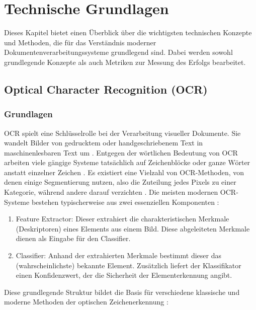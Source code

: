 \chapter{Technische Grundlagen}
\label{cha:technische-grundlagen}

Dieses Kapitel bietet einen Überblick über die wichtigsten technischen Konzepte und Methoden, die für das Verständnis moderner Dokumentenverarbeitungssysteme grundlegend sind. Dabei werden sowohl grundlegende Konzepte als auch Metriken zur Messung des Erfolgs bearbeitet. 

\section{Optical Character Recognition (OCR)}
\label{sec:optical-character-recognition-ocr}

\subsection{Grundlagen}
\label{subsec:grundlagen-ocr}

\gls{OCR} spielt eine Schlüsselrolle bei der Verarbeitung visueller Dokumente. 
Sie wandelt Bilder von gedrucktem oder handgeschriebenem Text in maschinenlesbaren Text um \parencite{MoriS.1992HroO}.
Entgegen der wörtlichen Bedeutung von \gls{OCR} arbeiten viele gängige Systeme tatsächlich auf Zeichenblöcke oder ganze Wörter anstatt einzelner Zeichen \parencite{BorovikovEugene2014Asom}.
Es existiert eine Vielzahl von \gls{OCR}-Methoden, von denen einige Segmentierung nutzen, also die Zuteilung jedes Pixels zu einer Kategorie, während andere darauf verzichten \parencite{BorovikovEugene2014Asom}. 
Die meisten modernen \gls{OCR}-Systeme bestehen typischerweise aus zwei essenziellen Komponenten \parencite{BorovikovEugene2014Asom}:

\begin{enumerate}
	\item Feature Extractor: Dieser extrahiert die charakteristischen Merkmale (Deskriptoren) eines Elements aus einem Bild. Diese abgeleiteten Merkmale dienen als Eingabe für den Classifier.
	\item Classifier: Anhand der extrahierten Merkmale bestimmt dieser das (wahrscheinlichste) bekannte Element. Zusätzlich liefert der Klassifikator einen Konfidenzwert, der die Sicherheit der Elementerkennung angibt.
\end{enumerate}

Diese grundlegende Struktur bildet die Basis für verschiedene klassische und moderne Methoden der optischen Zeichenerkennung \parencite{BorovikovEugene2014Asom}:


